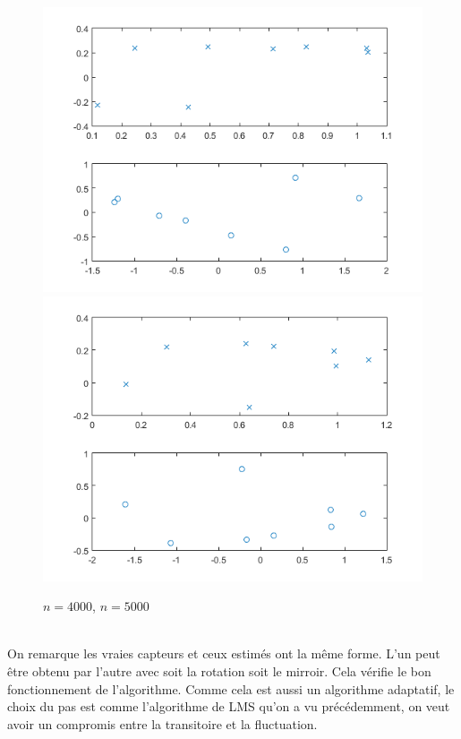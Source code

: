 \documentclass{article}
\begin{document}
\begin{figure}[h]
\includegraphics[scale=0.4]{sans_ancres_oja.png} \includegraphics[scale=0.4]{sans_ancres_oja2.png} 
\caption{$n = 4000$, $n=5000$}
\end{figure} 
\\On remarque les vraies capteurs et ceux estim\'es ont la m\^eme forme. L'un peut \^etre obtenu par l'autre avec soit la rotation soit le mirroir. Cela v\'erifie le bon fonctionnement de l'algorithme. Comme cela est aussi un algorithme adaptatif, le choix du pas est comme l'algorithme de LMS qu'on a vu pr\'ec\'edemment, on veut avoir un compromis entre la transitoire et la fluctuation. 
											
\end{document}
